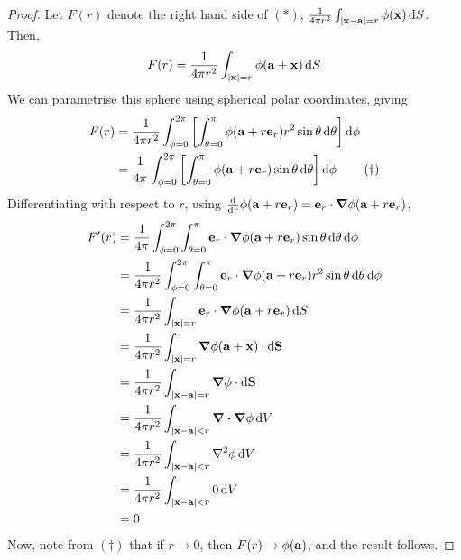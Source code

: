 \begin{proof}
	Let \(F(r)\) denote the right hand side of \((\ast)\), \(\frac{1}{4 \pi r^2} \int_{\abs{\vb x - \vb a} = r} \phi(\vb x) \dd{S}\).
	Then,
	\[
		F(r) = \frac{1}{4\pi r^2} \int_{\abs{\vb x} = r} \phi(\vb a + \vb x) \dd{S}
	\]
	We can parametrise this sphere using spherical polar coordinates, giving
	\begin{align}
		F(r) & = \frac{1}{4\pi r^2} \int_{\phi = 0}^{2 \pi} \left[ \int_{\theta = 0}^\pi \phi(\vb a + r\vb e_r) r^2 \sin \theta \dd{\theta} \right] \dd{\phi} \notag    \\
		     & = \frac{1}{4\pi} \int_{\phi = 0}^{2 \pi} \left[ \int_{\theta = 0}^\pi \phi(\vb a + r\vb e_r) \sin \theta \dd{\theta} \right] \dd{\phi} \tag{\(\dagger\)}
	\end{align}
	Differentiating with respect to \(r\), using \(\dv{r}\phi(\vb a + r \vb e_r) = \vb e_r \cdot \grad\phi(\vb a + r \vb e_r)\),
	\begin{align*}
		F'(r) & = \frac{1}{4\pi} \int_{\phi = 0}^{2 \pi} \int_{\theta = 0}^\pi \vb e_r \cdot \grad\phi(\vb a + r\vb e_r) \sin \theta \dd{\theta} \dd{\phi}         \\
		      & = \frac{1}{4\pi r^2} \int_{\phi = 0}^{2 \pi} \int_{\theta = 0}^\pi \vb e_r \cdot \grad\phi(\vb a + r\vb e_r) r^2 \sin \theta \dd{\theta} \dd{\phi} \\
		      & = \frac{1}{4\pi r^2} \int_{\abs{\vb x} = r} \vb e_r \cdot \grad\phi(\vb a + r\vb e_r) \dd{S}                                                       \\
		      & = \frac{1}{4\pi r^2} \int_{\abs{\vb x} = r} \grad\phi(\vb a + \vb x) \cdot \dd{\vb S}                                                              \\
		      & = \frac{1}{4\pi r^2} \int_{\abs{\vb x - \vb a} = r} \grad\phi \cdot \dd{\vb S}                                                                     \\
		      & = \frac{1}{4\pi r^2} \int_{\abs{\vb x - \vb a} < r} \div{\grad\phi} \dd{V}                                                                         \\
		      & = \frac{1}{4\pi r^2} \int_{\abs{\vb x - \vb a} < r} \laplacian{\phi} \dd{V}                                                                        \\
		      & = \frac{1}{4\pi r^2} \int_{\abs{\vb x - \vb a} < r} 0 \dd{V}                                                                                       \\
		      & = 0
	\end{align*}
	Now, note from \((\dagger)\) that if \(r \to 0\), then \(F(r) \to \phi(\vb a)\), and the result follows.
\end{proof}

